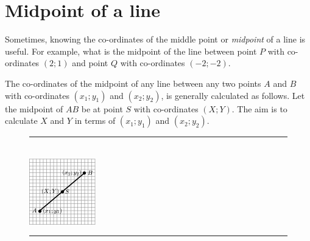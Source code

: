       \label{m39108**end}
%     
%     
%     
      \label{m39119*uid43}
            \section{ Midpoint of a line}
            \nopagebreak
\label{m39119*id68364}Sometimes, knowing the co-ordinates of the middle point or \textsl{midpoint} of a line is useful. For example, what is the midpoint of the line between point $P$ with co-ordinates $\left(2;1\right)$ and point $Q$ with co-ordinates $\left(-2;-2\right)$.\par 
        \label{m39119*id68433}The co-ordinates of the midpoint of any line between any two points $A$ and $B$ with co-ordinates $\left({x}_{1};{y}_{1}\right)$ and $\left({x}_{2};{y}_{2}\right)$, is generally calculated as follows. Let the midpoint of $AB$ be at point $S$ with co-ordinates $\left(X;Y\right)$. The aim is to calculate $X$ and $Y$ in terms of $\left({x}_{1};{y}_{1}\right)$ and $\left({x}_{2};{y}_{2}\right)$.\par 
    \setcounter{subfigure}{0}
	\begin{figure}[H] %
    \begin{center}
    \rule[.1in]{\figurerulewidth}{.005in} \\
        \label{m39119*uid44!!!underscore!!!media}\label{m39119*uid44!!!underscore!!!printimage}\includegraphics{col11306.imgs/m39119_MG10C14_019.png} %
      \vspace{2pt}
    \vspace{.1in}
    \rule[.1in]{\figurerulewidth}{.005in} \\
    \end{center}
 \end{figure}       

